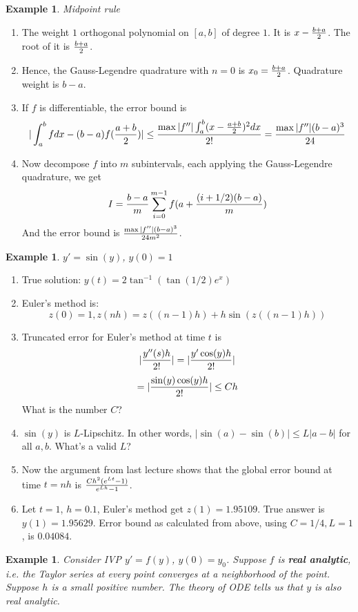 \documentclass{article} %
\theoremstyle{break}
\newtheorem{exa}[definition]{Example}
\begin{document}
\begin{exa}Midpoint rule\end{exa}
\begin{enumerate}
\item The weight $1$ orthogonal polynomial on $[a, b]$ of degree $1$. It is $x-{b+a\over 2}$. The root of it is ${b+a\over 2}$.
\item Hence, the Gauss-Legendre quadrature with $n=0$ is $x_0={b+a\over 2}$. Quadrature weight is ${b-a}$.
\item If $f$ is differentiable, the error bound is
  \[|\int_a^bfdx-{(b-a)}f({a+b\over 2})|\leq {\max|f''|\int_a^b(x-{a+b\over 2})^2dx\over 2!}={\max|f''|(b-a)^3\over 24}\]
\item Now decompose $f$ into $m$ subintervals, each applying the Gauss-Legendre quadrature, we get
  \[I={b-a\over m}\sum_{i=0}^{m-1} f(a+{(i+1/2)(b-a)\over m})\]
  And the error bound is $\max|f''|(b-a)^3\over 24m^2$.
\end{enumerate}


\begin{exa} $y'=\sin(y)$, $y(0)=1$\end{exa}
\begin{enumerate}
\item True solution: $y(t)=2\tan^{-1}(\tan(1/2)e^x)$\\
\item Euler's method is:
\[z(0)=1, z(nh)=z((n-1)h)+h\sin(z((n-1)h))\]
\item Truncated error for Euler's method at time $t$ is
  \[|{y''(s)h\over 2!}|=|{y'\cos(y)h\over 2!}|\]
  \[=|{\sin(y)\cos(y)h\over 2!}|\leq Ch\]
  What is the number $C$?
\item $\sin(y)$ is $L$-Lipschitz. In other words, $|\sin(a)-\sin(b)|\leq L|a-b|$ for all $a, b$. What's a valid $L$?
\item Now the argument from last lecture shows that the global error bound at time $t=nh$ is ${Ch^2(e^{Lt}-1)\over e^{Lh}-1}$. 
\item Let $t=1$, $h=0.1$, Euler's method get $z(1)=1.95109$. True answer is $y(1)=1.95629$. Error bound as calculated from above, using $C=1/4, L=1$, is $0.04084$.
\end{enumerate}



\begin{exa}Consider IVP $y'=f(y)$, $y(0)=y_0$. Suppose $f$ is {\bf real analytic}, i.e. the Taylor series at every point converges at a neighborhood of the point. Suppose $h$ is a small positive number. The theory of ODE tells us that $y$ is also real analytic.\end{exa}
\end{document}
